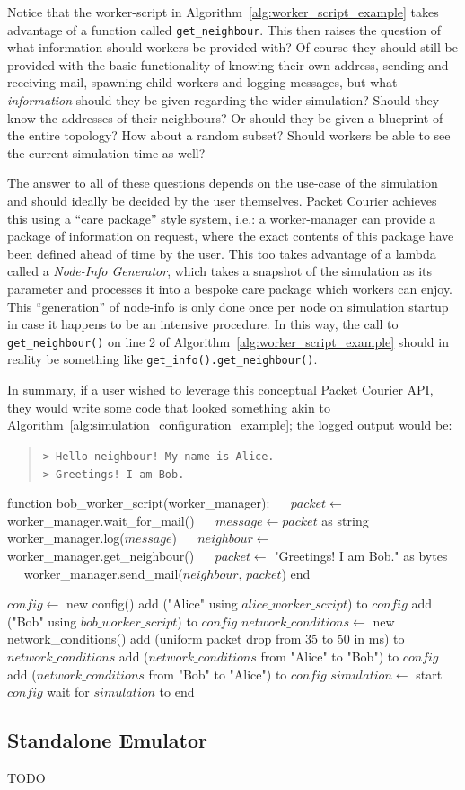 Notice that the worker-script in Algorithm~\ref{alg:worker_script_example} takes advantage of a function called
\texttt{get\_neighbour}. This then raises the question of what information should workers be provided with? Of course
they should still be provided with the basic functionality of knowing their own address, sending and receiving mail,
spawning child workers and logging messages, but what \emph{information} should they be given regarding the wider
simulation? Should they know the addresses of their neighbours? Or should they be given a blueprint of the entire
topology? How about a random subset? Should workers be able to see the current simulation time as well?

The answer to all of these questions depends on the use-case of the simulation and should ideally be decided by the
user themselves. Packet Courier achieves this using a ``care package'' style system, i.e.: a worker-manager can
provide a package of information on request, where the exact contents of this package have been defined ahead of
time by the user. This too takes advantage of a lambda called a \emph{Node-Info Generator}, which takes a snapshot of
the simulation as its parameter and processes it into a bespoke care package which workers can enjoy. This
``generation'' of node-info is only done once per node on simulation startup in case it happens to be an
intensive procedure. In this way, the call to \texttt{get\_neighbour()} on line 2 of
Algorithm~\ref{alg:worker_script_example} should in reality be something like \texttt{get\_info().get\_neighbour()}.

In summary, if a user wished to leverage this conceptual Packet Courier API, they would write some code that looked
something akin to Algorithm~\ref{alg:simulation_configuration_example}; the logged output would be:
\begin{quote}
    \texttt{> Hello neighbour! My name is Alice.} \\
    \texttt{> Greetings! I am Bob.}
\end{quote}

\newpage

\begin{algorithm}[caption={An example of what configuring a simulation might look like.},
    label={alg:simulation_configuration_example},
    captionpos=b]
    function bob_worker_script(worker_manager):
    $\quad$ $packet \gets$ worker_manager.wait_for_mail()
    $\quad$ $message \gets packet$ as string
    $\quad$ worker_manager.log($message$)
    $\quad$ $neighbour \gets$ worker_manager.get_neighbour()
    $\quad$ $packet \gets$ "Greetings! I am Bob." as bytes
    $\quad$ worker_manager.send_mail($neighbour$, $packet$)
    end

    $config \gets$ new config()
    add ("Alice" using $alice\_worker\_script$) to $config$
    add ("Bob" using $bob\_worker\_script$) to $config$
    $network\_conditions \gets$ new network_conditions()
    add (uniform packet drop from 35 to 50 in ms) to $network\_conditions$
    add ($network\_conditions$ from "Alice" to "Bob") to $config$
    add ($network\_conditions$ from "Bob" to "Alice") to $config$
    $simulation \gets$ start $config$
    wait for $simulation$ to end
\end{algorithm}

\subsection{Standalone Emulator}

TODO
